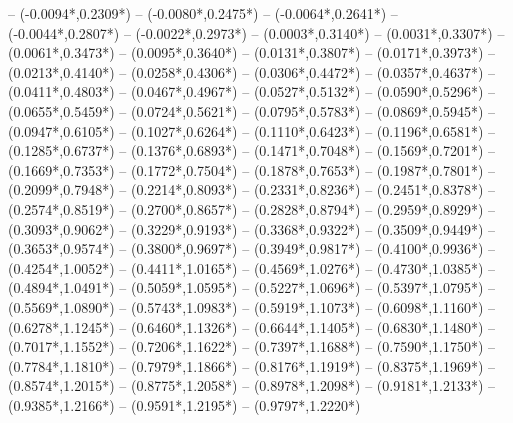 {	-- ({-0.0094*\dx},{0.2309*\dy})
	-- ({-0.0080*\dx},{0.2475*\dy})
	-- ({-0.0064*\dx},{0.2641*\dy})
	-- ({-0.0044*\dx},{0.2807*\dy})
	-- ({-0.0022*\dx},{0.2973*\dy})
	-- ({0.0003*\dx},{0.3140*\dy})
	-- ({0.0031*\dx},{0.3307*\dy})
	-- ({0.0061*\dx},{0.3473*\dy})
	-- ({0.0095*\dx},{0.3640*\dy})
	-- ({0.0131*\dx},{0.3807*\dy})
	-- ({0.0171*\dx},{0.3973*\dy})
	-- ({0.0213*\dx},{0.4140*\dy})
	-- ({0.0258*\dx},{0.4306*\dy})
	-- ({0.0306*\dx},{0.4472*\dy})
	-- ({0.0357*\dx},{0.4637*\dy})
	-- ({0.0411*\dx},{0.4803*\dy})
	-- ({0.0467*\dx},{0.4967*\dy})
	-- ({0.0527*\dx},{0.5132*\dy})
	-- ({0.0590*\dx},{0.5296*\dy})
	-- ({0.0655*\dx},{0.5459*\dy})
	-- ({0.0724*\dx},{0.5621*\dy})
	-- ({0.0795*\dx},{0.5783*\dy})
	-- ({0.0869*\dx},{0.5945*\dy})
	-- ({0.0947*\dx},{0.6105*\dy})
	-- ({0.1027*\dx},{0.6264*\dy})
	-- ({0.1110*\dx},{0.6423*\dy})
	-- ({0.1196*\dx},{0.6581*\dy})
	-- ({0.1285*\dx},{0.6737*\dy})
	-- ({0.1376*\dx},{0.6893*\dy})
	-- ({0.1471*\dx},{0.7048*\dy})
	-- ({0.1569*\dx},{0.7201*\dy})
	-- ({0.1669*\dx},{0.7353*\dy})
	-- ({0.1772*\dx},{0.7504*\dy})
	-- ({0.1878*\dx},{0.7653*\dy})
	-- ({0.1987*\dx},{0.7801*\dy})
	-- ({0.2099*\dx},{0.7948*\dy})
	-- ({0.2214*\dx},{0.8093*\dy})
	-- ({0.2331*\dx},{0.8236*\dy})
	-- ({0.2451*\dx},{0.8378*\dy})
	-- ({0.2574*\dx},{0.8519*\dy})
	-- ({0.2700*\dx},{0.8657*\dy})
	-- ({0.2828*\dx},{0.8794*\dy})
	-- ({0.2959*\dx},{0.8929*\dy})
	-- ({0.3093*\dx},{0.9062*\dy})
	-- ({0.3229*\dx},{0.9193*\dy})
	-- ({0.3368*\dx},{0.9322*\dy})
	-- ({0.3509*\dx},{0.9449*\dy})
	-- ({0.3653*\dx},{0.9574*\dy})
	-- ({0.3800*\dx},{0.9697*\dy})
	-- ({0.3949*\dx},{0.9817*\dy})
	-- ({0.4100*\dx},{0.9936*\dy})
	-- ({0.4254*\dx},{1.0052*\dy})
	-- ({0.4411*\dx},{1.0165*\dy})
	-- ({0.4569*\dx},{1.0276*\dy})
	-- ({0.4730*\dx},{1.0385*\dy})
	-- ({0.4894*\dx},{1.0491*\dy})
	-- ({0.5059*\dx},{1.0595*\dy})
	-- ({0.5227*\dx},{1.0696*\dy})
	-- ({0.5397*\dx},{1.0795*\dy})
	-- ({0.5569*\dx},{1.0890*\dy})
	-- ({0.5743*\dx},{1.0983*\dy})
	-- ({0.5919*\dx},{1.1073*\dy})
	-- ({0.6098*\dx},{1.1160*\dy})
	-- ({0.6278*\dx},{1.1245*\dy})
	-- ({0.6460*\dx},{1.1326*\dy})
	-- ({0.6644*\dx},{1.1405*\dy})
	-- ({0.6830*\dx},{1.1480*\dy})
	-- ({0.7017*\dx},{1.1552*\dy})
	-- ({0.7206*\dx},{1.1622*\dy})
	-- ({0.7397*\dx},{1.1688*\dy})
	-- ({0.7590*\dx},{1.1750*\dy})
	-- ({0.7784*\dx},{1.1810*\dy})
	-- ({0.7979*\dx},{1.1866*\dy})
	-- ({0.8176*\dx},{1.1919*\dy})
	-- ({0.8375*\dx},{1.1969*\dy})
	-- ({0.8574*\dx},{1.2015*\dy})
	-- ({0.8775*\dx},{1.2058*\dy})
	-- ({0.8978*\dx},{1.2098*\dy})
	-- ({0.9181*\dx},{1.2133*\dy})
	-- ({0.9385*\dx},{1.2166*\dy})
	-- ({0.9591*\dx},{1.2195*\dy})
	-- ({0.9797*\dx},{1.2220*\dy})
}
